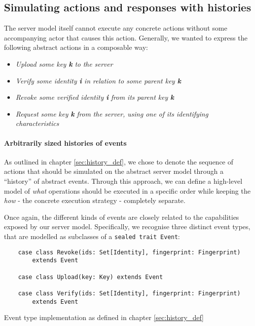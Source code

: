\subsection{Simulating actions and responses with histories}
The server model itself cannot execute any concrete actions without some accompanying actor that causes this action. Generally, we wanted to express the following abstract actions in a composable way: 
\begin{itemize}
    \item \emph{Upload some key \textbf{k} to the server}
    \item \emph{Verify some identity \textbf{i} in relation to some parent key \textbf{k}}
    \item \emph{Revoke some verified identity \textbf{i} from its parent key \textbf{k}}
    \item \emph{Request some key \textbf{k} from the server, using one of its identifying characteristics}
\end{itemize}

\paragraph{Arbitrarily sized histories of events}
As outlined in chapter \ref{sec:history_def}, we chose to denote the sequence of actions that should be simulated on the abstract server model through a ``history'' of abstract events.
Through this approach, we can define a high-level model of \emph{what} operations should be executed in a specific order while keeping the \emph{how} - the concrete execution strategy - completely separate.

Once again, the different kinds of events are closely related to the capabilities exposed by our server model. Specifically, we recognise three distinct event types, that are modelled as subclasses of a \texttt{sealed trait Event}: 
\begin{code}
    \begin{verbatim}
    case class Revoke(ids: Set[Identity], fingerprint: Fingerprint) 
        extends Event
    
    case class Upload(key: Key) extends Event
    
    case class Verify(ids: Set[Identity], fingerprint: Fingerprint) 
        extends Event
    \end{verbatim}
    \caption{Event type implementation as defined in chapter \ref{sec:history_def}}
\end{code}

